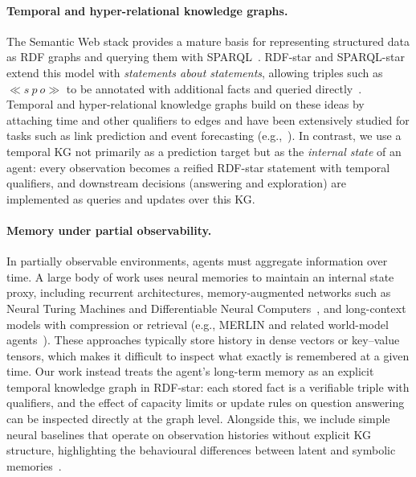 \documentclass[runningheads]{llncs}
\begin{document}
\paragraph{Temporal and hyper-relational knowledge graphs.}
The Semantic Web stack provides a mature basis for representing structured data as
RDF graphs and querying them with SPARQL~\cite{Seaborne:13:SQL}.
RDF-star and SPARQL-star extend this model with \emph{statements about statements},
allowing triples such as $\ll s\ p\ o\gg$ to be annotated with additional facts and
queried directly~\cite{hartig2021foundationsalternativeapproachreification}.
Temporal and hyper-relational knowledge graphs build on these ideas by attaching
time and other qualifiers to edges and have been extensively studied for tasks such
as link prediction and event forecasting
(e.g.,~\cite{DBLP:journals/corr/abs-1809-03202}).
In contrast, we use a temporal KG not primarily as a prediction target but as the
\emph{internal state} of an agent: every observation becomes a reified RDF-star
statement with temporal qualifiers, and downstream decisions (answering and exploration)
are implemented as queries and updates over this KG.

\paragraph{Memory under partial observability.}
In partially observable environments, agents must aggregate information over time.
A large body of work uses neural memories to maintain an internal state proxy, including
recurrent architectures, memory-augmented networks such as Neural Turing Machines
and Differentiable Neural Computers~\cite{graves2014neural,graves2016hybrid},
and long-context models with compression or retrieval
(e.g., MERLIN and related world-model agents~\cite{Wayne2018MERLIN,DBLP:journals/corr/abs-1803-10122}).
These approaches typically store history in dense vectors or key–value tensors,
which makes it difficult to inspect what exactly is remembered at a given time.
Our work instead treats the agent’s long-term memory as an explicit temporal
knowledge graph in RDF-star: each stored fact is a verifiable triple with qualifiers,
and the effect of capacity limits or update rules on question answering can be
inspected directly at the graph level. Alongside this, we include simple neural
baselines that operate on observation histories without explicit KG structure,
highlighting the behavioural differences between latent and symbolic memories~\cite{kimura2021neurosymbolicreinforcementlearningfirstorder}.
\end{document}
